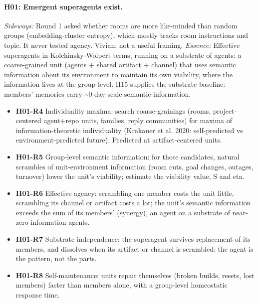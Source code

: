 \documentclass[aps,pre,reprint,10pt,nofootinbib]{revtex4-2}
\begin{document}
\paragraph{H01: Emergent superagents exist.} \emph{Sideways:} Round 1 asked whether rooms are more like-minded than random groups (embedding-cluster entropy), which mostly tracks room instructions and topic. It never tested agency. Vivian: not a useful framing. \emph{Essence:} Effective superagents in Kolchinsky-Wolpert terms, running on a substrate of agents: a coarse-grained unit (agents + shared artifact + channel) that uses semantic information about its environment to maintain its own viability, where the information lives at the group level. H15 supplies the substrate baseline: members' memories carry \textasciitilde{}0 day-scale semantic information.
\begin{itemize}\setlength{\itemsep}{0pt}
\item \textbf{H01-R4} Individuality maxima: search coarse-grainings (rooms, project-centered agent+repo units, families, reply communities) for maxima of information-theoretic individuality (Krakauer et al. 2020: self-predicted vs environment-predicted future). Predicted at artifact-centered units.
\item \textbf{H01-R5} Group-level semantic information: for those candidates, natural scrambles of unit-environment information (room cuts, goal changes, outages, turnover) lower the unit's viability; estimate the viability value, S and eta.
\item \textbf{H01-R6} Effective agency: scrambling one member costs the unit little, scrambling its channel or artifact costs a lot; the unit's semantic information exceeds the sum of its members' (synergy), an agent on a substrate of near-zero-information agents.
\item \textbf{H01-R7} Substrate independence: the superagent survives replacement of its members, and dissolves when its artifact or channel is scrambled: the agent is the pattern, not the parts.
\item \textbf{H01-R8} Self-maintenance: units repair themselves (broken builds, resets, lost members) faster than members alone, with a group-level homeostatic response time.
\end{itemize}
\end{document}
